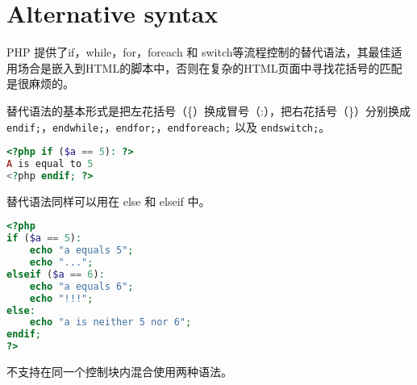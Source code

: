 \section{Alternative syntax}


PHP 提供了if，while，for，foreach 和 switch等流程控制的替代语法，其最佳适用场合是嵌入到HTML的脚本中，否则在复杂的HTML页面中寻找花括号的匹配是很麻烦的。

替代语法的基本形式是把左花括号（\{）换成冒号（:），把右花括号（\}）分别换成\texttt{endif;}，\texttt{endwhile;}，\texttt{endfor;}，\texttt{endforeach;} 以及 \texttt{endswitch;}。

\begin{lstlisting}[language=PHP]
<?php if ($a == 5): ?>
A is equal to 5
<?php endif; ?>
\end{lstlisting}

替代语法同样可以用在 else 和 elseif 中。

\begin{lstlisting}[language=PHP]
<?php
if ($a == 5):
    echo "a equals 5";
    echo "...";
elseif ($a == 6):
    echo "a equals 6";
    echo "!!!";
else:
    echo "a is neither 5 nor 6";
endif;
?>
\end{lstlisting}

不支持在同一个控制块内混合使用两种语法。